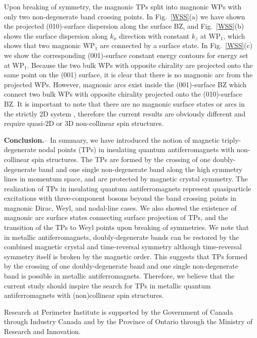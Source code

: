 \documentclass[doublecol]{epl2}
\begin{document}
 Upon breaking of symmetry, the magnonic TPs split into magnonic WPs with only two non-degenerate band crossing points.   In Fig.~\ref{WSS}(a) we have shown the projected (010)-surface dispersion along the surface BZ,  and Fig.~\ref{WSS}(b) shows the surface dispersion along $k_x$ direction with constant $k_z$ at WP$_1$, which shows that two magnonic WP$_1$ are connected by a surface state.  In Fig.~\ref{WSS}(c) we show the corresponding (001)-surface constant energy contours for energy set at WP$_1$.  Because  the two bulk WPs with opposite chirality are projected onto the same point on the (001) surface,  it is clear  that there is no magnonic arc from the projected WPs. However, magnonic arcs exist inside the (001)-surface BZ which connect   two bulk WPs with opposite chirality projected onto the (010)-surface BZ. It is important to note that there are no magnonic surface states or arcs in the strictly 2D system \cite{2d}, therefore the current results are obviously different and require quasi-2D or 3D non-collinear spin structures.

\textbf{Conclusion.}-- In summary, we have introduced the notion of magnetic triply-degenerate nodal points (TPs) in insulating quantum antiferromagnets with non-collinear spin structures. The TPs are formed by the crossing of one doubly-degenerate band and one single non-degenerate band along the high symmetry lines in momentum space, and are protected by magnetic crystal symmetry.  The realization of TPs in insulating quantum antiferromagnets represent quasiparticle excitations with three-component bosons  beyond the band crossing points in magnonic Dirac, Weyl,  and nodal-line cases. We also showed the existence of magnonic arc surface states connecting surface projection of TPs, and the transition of the TPs to Weyl points upon breaking of symmetries.  We note that in metallic antiferromagnets, doubly-degenerate bands can be restored by the combined magnetic crystal and time-reversal symmetry  although time-reversal symmetry itself is broken by the magnetic order. This suggests that TPs formed by the crossing of one doubly-degenerate band and one single non-degenerate band is possible in metallic antiferromagnets. Therefore, we believe that the current study should inspire the search for TPs in metallic quantum antiferromagnets with (non)collinear spin structures.  

\acknowledgments
Research at Perimeter Institute is supported by the Government of Canada through Industry Canada and by the Province of Ontario through the Ministry of Research
and Innovation. 
\end{document}
